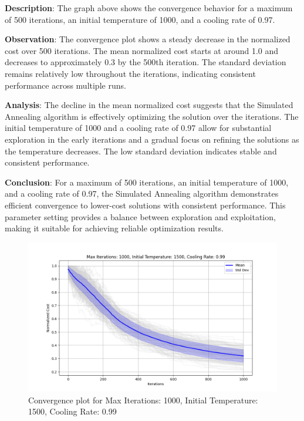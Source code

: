 \documentclass[
]{article}
\begin{document}
    \textbf{Description}: The graph above shows the convergence behavior for a maximum of 500 iterations, an initial temperature of 1000, and a cooling rate of 0.97.

    \textbf{Observation}: The convergence plot shows a steady decrease in the normalized cost over 500 iterations. The mean normalized cost starts at around 1.0 and decreases to approximately 0.3 by the 500th iteration. The standard deviation remains relatively low throughout the iterations, indicating consistent performance across multiple runs.

    \textbf{Analysis}: The decline in the mean normalized cost suggests that the Simulated Annealing algorithm is effectively optimizing the solution over the iterations. The initial temperature of 1000 and a cooling rate of 0.97 allow for substantial exploration in the early iterations and a gradual focus on refining the solutions as the temperature decreases. The low standard deviation indicates stable and consistent performance.

    \textbf{Conclusion}: For a maximum of 500 iterations, an initial temperature of 1000, and a cooling rate of 0.97, the Simulated Annealing algorithm demonstrates efficient convergence to lower-cost solutions with consistent performance. This parameter setting provides a balance between exploration and exploitation, making it suitable for achieving reliable optimization results.

    \begin{figure}[H]
        \centering
        \includegraphics[width=\textwidth]{simulated_annealing/max_iter_1000_init_temp_1500_cooling_rate_0.99}
        \caption{Convergence plot for Max Iterations: 1000, Initial Temperature: 1500, Cooling Rate: 0.99}
        \label{fig:sa_1000_1500_0.99}
    \end{figure}
\end{document}
